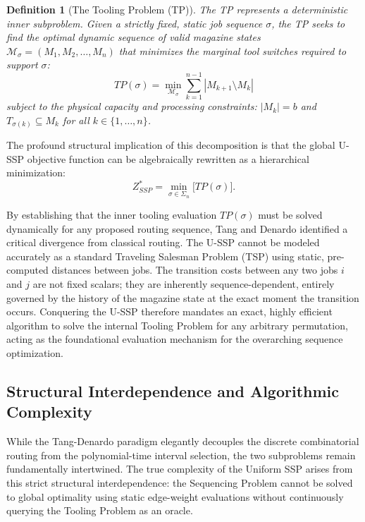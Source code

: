 \documentclass[11pt, a4paper]{book}
\newtheorem{definition}[theorem]{Definition}
\begin{document}
	\begin{definition}[The Tooling Problem (TP)]
		The TP represents a deterministic inner subproblem. Given a strictly fixed, static job sequence $\sigma$, the TP seeks to find the optimal dynamic sequence of valid magazine states $\mathcal{M}_\sigma = (M_1, M_2, \dots, M_n)$ that minimizes the marginal tool switches required to support $\sigma$:
		\begin{equation}
			TP(\sigma) = \min_{\mathcal{M}_\sigma} \sum_{k=1}^{n-1} |M_{k+1} \setminus M_k|
		\end{equation}
		subject to the physical capacity and processing constraints: $|M_k| = b$ and $T_{\sigma(k)} \subseteq M_k$ for all $k \in \{1, \dots, n\}$.
	\end{definition}
	
	The profound structural implication of this decomposition is that the global U-SSP objective function can be algebraically rewritten as a hierarchical minimization:
	\begin{equation}
		Z_{SSP}^* = \min_{\sigma \in \Sigma_n} \Big[ TP(\sigma) \Big].
	\end{equation}
	
	By establishing that the inner tooling evaluation $TP(\sigma)$ must be solved dynamically for any proposed routing sequence, Tang and Denardo \cite{Tang1988} identified a critical divergence from classical routing. The U-SSP cannot be modeled accurately as a standard Traveling Salesman Problem (TSP) using static, pre-computed distances between jobs. The transition costs between any two jobs $i$ and $j$ are not fixed scalars; they are inherently sequence-dependent, entirely governed by the history of the magazine state at the exact moment the transition occurs. Conquering the U-SSP therefore mandates an exact, highly efficient algorithm to solve the internal Tooling Problem for any arbitrary permutation, acting as the foundational evaluation mechanism for the overarching sequence optimization.
	
	
	\subsection{Structural Interdependence and Algorithmic Complexity}
	
	While the Tang-Denardo paradigm elegantly decouples the discrete combinatorial routing from the polynomial-time interval selection, the two subproblems remain fundamentally intertwined. The true complexity of the Uniform SSP arises from this strict structural interdependence: the Sequencing Problem cannot be solved to global optimality using static edge-weight evaluations without continuously querying the Tooling Problem as an oracle.
	
\end{document}

